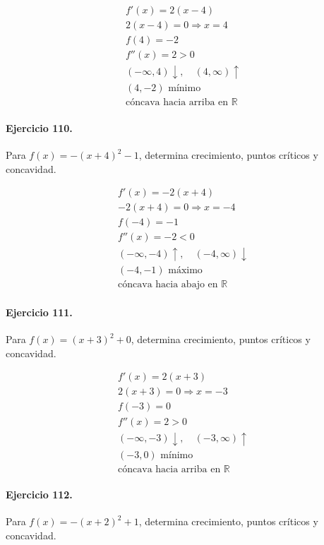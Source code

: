 \documentclass[11pt,a4paper]{article}
\begin{document}
\[
\begin{aligned}
f'(x)=2(x-4)\\
2(x-4)=0\Rightarrow x=4\\
f(4)=-2\\
f''(x)=2>0\\
(-\infty,4)\downarrow,\quad(4,\infty)\uparrow\\
(4,-2)\text{ mínimo}\\
\text{{cóncava hacia arriba en }}\mathbb{R}
\end{aligned}
\]


\paragraph{Ejercicio 110.} Para $f(x)=-(x+4)^2-1$, determina crecimiento, puntos críticos y concavidad.

\[
\begin{aligned}
f'(x)=-2(x+4)\\
-2(x+4)=0\Rightarrow x=-4\\
f(-4)=-1\\
f''(x)=-2<0\\
(-\infty,-4)\uparrow,\quad(-4,\infty)\downarrow\\
(-4,-1)\text{ máximo}\\
\text{{cóncava hacia abajo en }}\mathbb{R}
\end{aligned}
\]


\paragraph{Ejercicio 111.} Para $f(x)=(x+3)^2+0$, determina crecimiento, puntos críticos y concavidad.

\[
\begin{aligned}
f'(x)=2(x+3)\\
2(x+3)=0\Rightarrow x=-3\\
f(-3)=0\\
f''(x)=2>0\\
(-\infty,-3)\downarrow,\quad(-3,\infty)\uparrow\\
(-3,0)\text{ mínimo}\\
\text{{cóncava hacia arriba en }}\mathbb{R}
\end{aligned}
\]


\paragraph{Ejercicio 112.} Para $f(x)=-(x+2)^2+1$, determina crecimiento, puntos críticos y concavidad.
\end{document}
